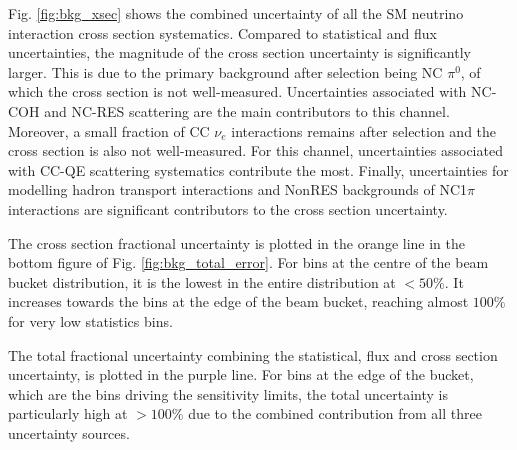 Fig. \ref{fig:bkg_xsec} shows the combined uncertainty of all the SM neutrino interaction cross section systematics.
Compared to statistical and flux uncertainties, the magnitude of the cross section uncertainty is significantly larger.
This is due to the primary background after selection being NC $\pi^0$, of which the cross section is not well-measured.  
Uncertainties associated with NC-COH and NC-RES scattering are the main contributors to this channel.
Moreover, a small fraction of CC $\nu_e$ interactions remains after selection and the cross section is also not well-measured.
For this channel, uncertainties associated with CC-QE scattering systematics contribute the most.
Finally, uncertainties for modelling hadron transport interactions and NonRES backgrounds of NC1$\pi$ interactions are significant contributors to the cross section uncertainty.

The cross section fractional uncertainty is plotted in the orange line in the bottom figure of Fig. \ref{fig:bkg_total_error}.
For bins at the centre of the beam bucket distribution, it is the lowest in the entire distribution at $< 50\%$.
It increases towards the bins at the edge of the beam bucket, reaching almost $100 \%$ for very low statistics bins.

The total fractional uncertainty combining the statistical, flux and cross section uncertainty, is plotted in the purple line.
For bins at the edge of the bucket, which are the bins driving the sensitivity limits, the total uncertainty is particularly high at $> 100\%$ due to the combined contribution from all three uncertainty sources.

